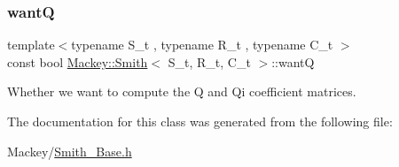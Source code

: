 \subsubsection{\texorpdfstring{wantQ}{wantQ}}
{\footnotesize\ttfamily template$<$typename S\+\_\+t , typename R\+\_\+t , typename C\+\_\+t $>$ \\
const bool \hyperlink{classMackey_1_1Smith}{Mackey\+::\+Smith}$<$ S\+\_\+t, R\+\_\+t, C\+\_\+t $>$\+::wantQ\hspace{0.3cm}{\ttfamily [protected]}}



Whether we want to compute the Q and Qi coefficient matrices. 



The documentation for this class was generated from the following file\+:\begin{DoxyCompactItemize}
\item 
Mackey/\hyperlink{Smith__Base_8h}{Smith\+\_\+\+Base.\+h}\end{DoxyCompactItemize}
